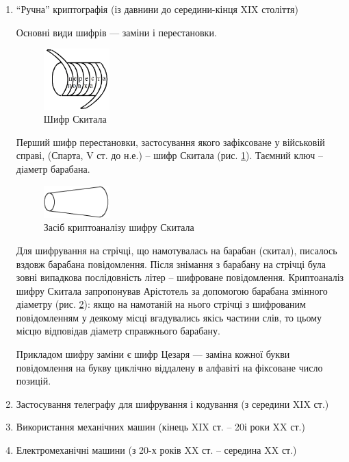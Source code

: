 \begin{enumerate}
    \item ``Ручна'' криптографія (із давнини до середини-кінця XIX століття)

        Основні види шифрів --- заміни і перестановки.

        \begin{figure}[hb]
            \centering\includegraphics[width=1.0in]{crypt-img/crypt-img1.png}
            \caption{Шифр Скитала}\label{scitalCipher}
        \end{figure}

        Перший шифр перестановки,
        застосування якого зафіксоване у військовій справі,
        (Спарта, V ст. до н.е.) – шифр Скитала (рис. \ref{scitalCipher}).
        Таємний ключ – діаметр барабана.

        \begin{figure}[hb]
            \centering\includegraphics[width=1.0in]{crypt-img/crypt-img2.png}
            \caption{Засіб криптоаналізу шифру Скитала}\label{scitalAnalysis}
        \end{figure}

        Для  шифрування на стрічці, що намотувалась на барабан (скитал),
        писалось вздовж барабана повідомлення.
        Після знімання з барабану на стрічці була зовні
        випадкова послідовність літер – шифроване повідомлення.
        Криптоаналіз шифру Скитала запропонував Арістотель
        за допомогою барабана змінного діаметру (рис. \ref{scitalAnalysis}):
        якщо на намотаній на нього стрічці з шифрованим повідомленням у
        деякому місці вгадувались якісь частини слів,
        то цьому місцю відповідав діаметр справжнього барабану. 

        Прикладом шифру заміни є шифр Цезаря --- заміна кожної букви
        повідомлення на букву  циклічно віддалену
        в алфавіті на фіксоване число позицій.
    \item Застосування телеграфу для шифрування і кодування (з середини XIX ст.)
    \item Використання механічних машин (кінець XIX ст. – 20і роки XX ст.)
    \item Електромеханічні машини (з 20-х років XX ст. – середина XX ст.)


\end{enumerate}

